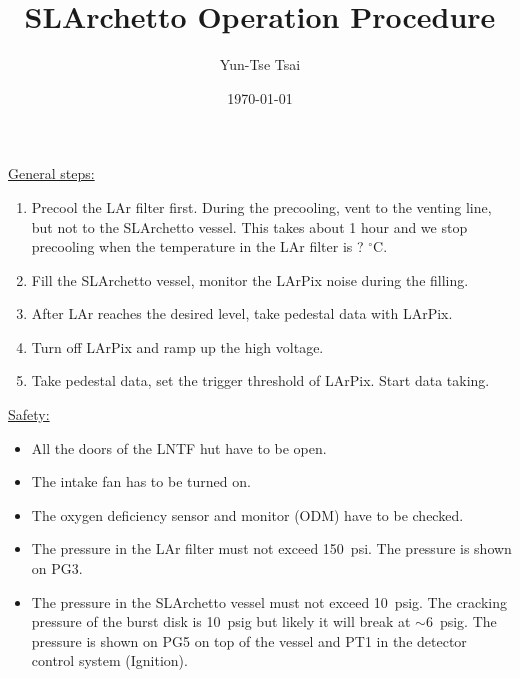 \documentclass[letterpaper,11pt]{article}
\newcommand{\dC}        {$^\circ$C}
\begin{document}
\title{\textbf{SLArchetto Operation Procedure}}
\author{Yun-Tse Tsai}
\date{\today}

\maketitle


\underline{General steps:}
\begin{enumerate}
\setlength\itemsep{-0.2em}
\item Precool the LAr filter first.  During the precooling, vent to the venting line, 
but not to the SLArchetto vessel.  This takes about 1 hour and we stop precooling when the
temperature in the LAr filter is {\color{orange}? {\dC}}.
\item Fill the SLArchetto vessel, monitor the LArPix noise during the filling.
\item After LAr reaches the desired level, take pedestal data with LArPix.
\item Turn off LArPix and ramp up the high voltage.
\item Take pedestal data, set the trigger threshold of LArPix.  Start data taking.
\end{enumerate}  

\underline{Safety:}
\begin{itemize}
\setlength\itemsep{-0.2em}
\item All the doors of the LNTF hut have to be open.
\item The intake fan has to be turned on.
\item The oxygen deficiency sensor and monitor (ODM) have to be checked.
\item The pressure in the LAr filter must not exceed 150~psi.  The pressure is shown on PG3.
\item The pressure in the SLArchetto vessel must not exceed 10~psig.  The cracking pressure of the burst disk is 10~psig
but likely it will break at $\sim$6~psig.
The pressure is shown on PG5 on top of the vessel and PT1 in the detector control system (Ignition).
\end{itemize}
\end{document}
